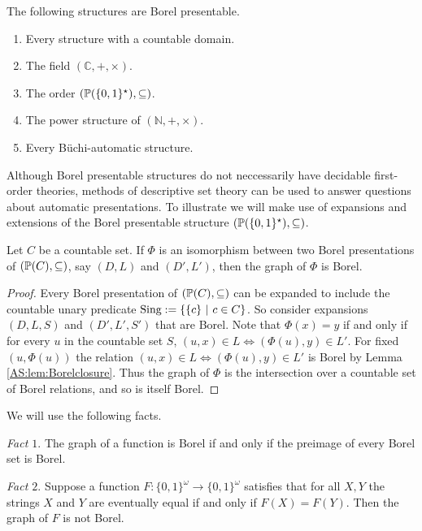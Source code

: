\begin{example} The following structures are Borel presentable.
 \begin{enumerate}
  \item Every structure with a countable domain.
  \item The field $(\mathbb{C},+,\times)$.
  \item The order $({\mathbb P}(\{0,1\}^\star),\subseteq)$.
  \item The power structure of $(\mathbb{N},+,\times)$.
  \item Every  B\"uchi-automatic structure.
 \end{enumerate}
\end{example}

Although Borel presentable structures do not neccessarily have decidable first-order theories, methods of descriptive set theory can
be used to answer questions about automatic presentations. To illustrate we will make use of expansions and extensions of the Borel presentable
structure $({\mathbb P}(\{0,1\}^\star),\subseteq)$.

\begin{lemma}  \label{AS:lem:borel}
Let $C$ be a countable set.
If $\Phi$ is an isomorphism between two Borel presentations of $({\mathbb P}(C),\subseteq)$, say $(D,L)$ and $(D',L')$, 
then the graph of $\Phi$ is Borel.
\end{lemma}

\begin{proof}
Every Borel presentation of  $({\mathbb P}(C),\subseteq)$ can be expanded to include the countable unary predicate $\text{Sing} := \{\{c\} \ \vert \  c \in C\}$.
So consider expansions $(D,L,S)$ and $(D',L',S')$ that are Borel.
Note that $\Phi(x)=y$ if and only if for every $u$ in the countable set $S$, $(u,x) \in L \iff (\Phi(u),y) \in L'$.  For fixed $(u,\Phi(u))$ the relation $(u,x) \in L \iff (\Phi(u),y) \in L'$ is Borel by Lemma \ref{AS:lem:Borelclosure}. Thus the graph of $\Phi$ is the intersection over a countable set of Borel relations, and so is itself Borel.
\end{proof}

We will use the following facts. 

{\em Fact $1.$} The graph of a function is Borel if and only if the preimage of every Borel set is Borel.

{\em Fact $2.$}  Suppose a function $F:\{0,1\}^\omega \to \{0,1\}^\omega$ satisfies that for all $X,Y$ 
the strings $X$ and $Y$ are eventually equal if and only if $F(X) = F(Y)$. Then the graph of $F$ is not Borel.

